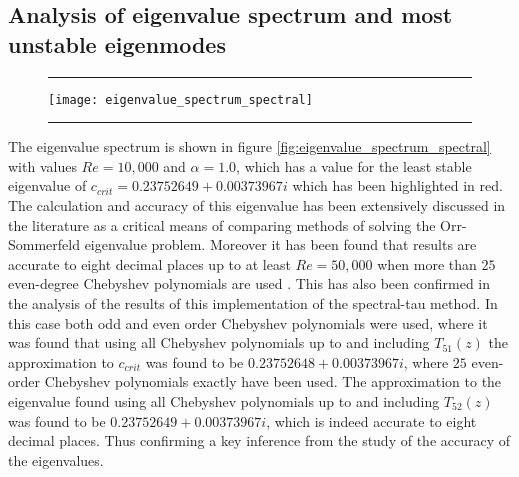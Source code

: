 \documentclass[a4paper, 12pt, twoside, openright]{article}
\numberwithin{equation}{section}
\begin{document}
\subsection{Analysis of eigenvalue spectrum and most unstable eigenmodes}
\begin{figure}[h]
\centering
\rule{\linewidth}{1.5pt}
\texttt{[image: eigenvalue\_spectrum\_spectral]}
\rule{\linewidth}{1.5pt}
\end{figure}
The eigenvalue spectrum is shown in figure \ref{fig:eigenvalue_spectrum_spectral} with values $Re=10,000$ and $\alpha=1.0$, which has a value for the least stable eigenvalue of $c_{crit}=  0.23752649 + 0.00373967i$ which has been highlighted in red. The calculation and accuracy of this eigenvalue has been extensively discussed in the literature as a critical means of comparing methods of solving the Orr-Sommerfeld eigenvalue problem. Moreover it has been found that results are accurate to eight decimal places up to at least $Re=50,000$ when more than $25$ even-degree Chebyshev polynomials are used \citep{Orszag71}. This has also been confirmed in the analysis of the results of this implementation of the spectral-tau method. In this case both odd and even order Chebyshev polynomials were used, where it was found that using all Chebyshev polynomials up to and including $T_{51}(z)$ the approximation to $c_{crit}$ was found to be $0.23752648 + 0.00373967i$, where $25$ even-order Chebyshev polynomials exactly have been used. The approximation to the eigenvalue found using all Chebyshev polynomials up to and including $T_{52}(z)$ was found to be $0.23752649 + 0.00373967i$, which is indeed accurate to eight decimal places. Thus confirming a key inference from the study of the accuracy of the eigenvalues.%
\end{document}
